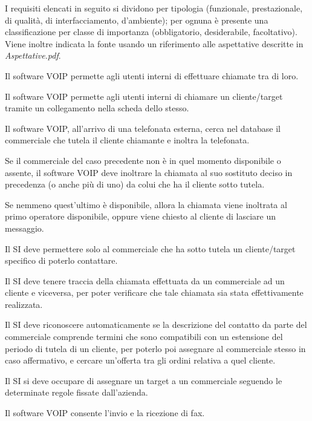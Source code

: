 \newpage
{}
\label{listarequisiti}
I requisiti elencati in seguito si dividono per tipologia (funzionale, prestazionale, di qualit\`a, di interfacciamento, d'ambiente); 
per ognuna \`e presente una classificazione per classe di importanza (obbligatorio, desiderabile, facoltativo). Viene inoltre indicata la fonte usando un riferimento alle aspettative descritte in \textit{Aspettative.pdf}.
\begin{elenconumerato}{\subsubsecindent}
\item{Il software VOIP permette agli utenti interni di effettuare chiamate tra di loro.}
\item{Il software VOIP permette agli utenti interni di chiamare un cliente/target tramite un collegamento nella scheda dello stesso.}
\item{Il software VOIP, all'arrivo di una telefonata esterna, cerca nel database il commerciale che tutela il cliente chiamante e inoltra la telefonata.}
\item{Se il commerciale del caso precedente non \`e  in quel momento disponibile o assente, il software VOIP deve inoltrare la chiamata al suo sostituto deciso in precedenza (o anche pi\`u di uno) da colui che ha il cliente sotto tutela.}
\item{Se nemmeno quest'ultimo \`e disponibile, allora la chiamata viene inoltrata al primo operatore disponibile, oppure viene chiesto al cliente di lasciare un messaggio.}
\item{Il SI deve permettere solo al commerciale che ha sotto tutela un cliente/target specifico di poterlo contattare.}
\item{Il SI deve tenere traccia della chiamata effettuata da un commerciale ad un cliente e viceversa, per poter verificare che tale chiamata sia stata effettivamente realizzata.}
\item{Il SI deve riconoscere automaticamente se la descrizione del contatto da parte del commerciale comprende termini che sono compatibili con un estensione del periodo di tutela di un cliente, per poterlo poi assegnare al commerciale stesso in caso affermativo, e cercare un'offerta tra gli ordini relativa a quel cliente.}
\item{Il SI si deve occupare di assegnare un target a un commerciale seguendo le determinate regole fissate dall'azienda.}
\item{Il software VOIP consente l'invio e la ricezione di fax.}

\end{elenconumerato}
